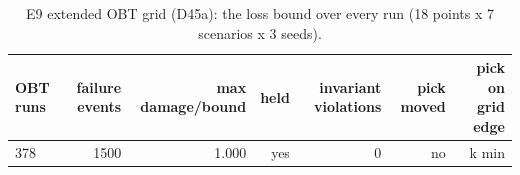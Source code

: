 \begin{table}[t]
\centering
\small
\caption{E9 extended OBT grid (D45a): the loss bound over every run (18 points x 7 scenarios x 3 seeds).}
\label{tab:e9_calibration_ext_bound}
\begin{tabular}{lrrrrrr}
\toprule
OBT runs & failure events & max damage/bound & held & invariant violations & pick moved & pick on grid edge \\
\midrule
378 & 1500 & 1.000 & yes & 0 & no & k min \\
\bottomrule
\end{tabular}
\end{table}
